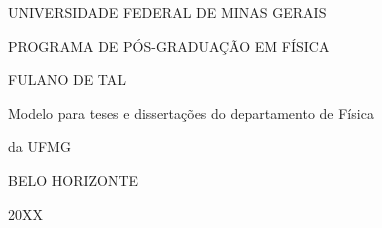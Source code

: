 \centerline{\large UNIVERSIDADE FEDERAL DE MINAS GERAIS}
\centerline{\large PROGRAMA DE PÓS-GRADUAÇÃO EM FÍSICA}

\vspace{5cm}

\centerline{\large FULANO DE TAL}

\vspace{5.5cm}

\centerline{\Large Modelo para teses e dissertações do departamento de Física}
\centerline{\Large da UFMG}

\vspace{10cm}


\centerline{\large BELO HORIZONTE}
\centerline{\large 20XX}
\newpage
